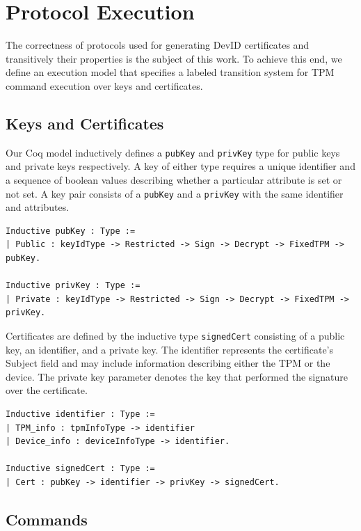\documentclass[runningheads]{llncs}
\begin{document}
\section{Protocol Execution}

The correctness of protocols used for generating DevID certificates
and transitively their properties is the subject of this work.  To
achieve this end, we define an execution model that specifies a
labeled transition system for TPM command execution over keys and
certificates.

\subsection{Keys and Certificates}

Our Coq model inductively defines a \verb|pubKey| and \verb|privKey|
type for public keys and private keys respectively. A key of either
type requires a unique identifier and a sequence of boolean values
describing whether a particular attribute is set or not set. A key
pair consists of a \verb|pubKey| and a \verb|privKey| with the same
identifier and attributes.

\begin{lstlisting}[language=Coq]
Inductive pubKey : Type :=
| Public : keyIdType -> Restricted -> Sign -> Decrypt -> FixedTPM -> pubKey.

Inductive privKey : Type :=
| Private : keyIdType -> Restricted -> Sign -> Decrypt -> FixedTPM -> privKey.
\end{lstlisting}

Certificates are defined by the inductive type \verb|signedCert|
consisting of a public key, an identifier, and a private key. The
identifier represents the certificate's Subject field and may include
information describing either the TPM or the device. The private key
parameter denotes the key that performed the signature over the
certificate.

\begin{lstlisting}[language=Coq]
Inductive identifier : Type :=
| TPM_info : tpmInfoType -> identifier
| Device_info : deviceInfoType -> identifier.

Inductive signedCert : Type :=
| Cert : pubKey -> identifier -> privKey -> signedCert.
\end{lstlisting}

\subsection{Commands}
\end{document}
